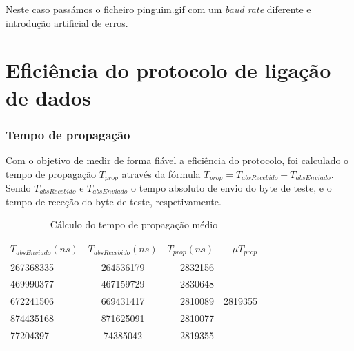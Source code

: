 \documentclass[11pt]{report}
\begin{document}
Neste caso passámos o ficheiro pinguim.gif com um \textit{baud rate} diferente e
introdução artificial de erros.

{\let\clearpage\relax \chapter{Eficiência do protocolo de ligação de dados}}

\subsection{Tempo de propagação}

Com o objetivo de medir de forma fiável a eficiência do protocolo, foi calculado
o tempo de propagação $T_{prop}$ através da fórmula
$T_{prop} = T_{absRecebido} - T_{absEnviado}$. Sendo $T_{absRecebido}$ e $T_{absEnviado}$ o tempo
absoluto de envio do byte de teste, e o tempo de receção do byte de teste,
respetivamente.

\begin{table}[h!]
  \begin{center}
    \caption{Cálculo do tempo de propagação médio}
    \label{tab:table1}
    \begin{tabular}{l|c|r|r} %
        \textbf{$T_{absEnviado}(ns)$} &\textbf{$T_{absRecebido}(ns)$} & \textbf{$T_{prop}(ns)$} & \textbf{$\mu T_{prop}$}\\
      \hline
      267368335 & 264536179 & 2832156\\
      469990377 & 467159729 & 2830648\\
        672241506 & 669431417 & 2810089 & 2819355\\
      874435168 & 871625091 & 2810077\\
      77204397 & 74385042 & 2819355\\
    \end{tabular}
  \end{center}
\end{table}
\end{document}
